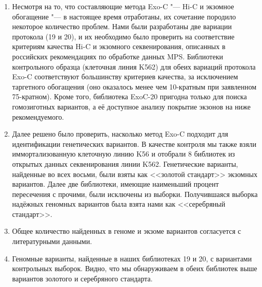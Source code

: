 \documentclass[a4paper,14pt]{extarticle}
\begin{document}
\begin{enumerate}
\item Несмотря на то, что составляющие метода Exo-C "--- Hi-C и экзомное обогащение "--- в настоящее время отработаны, их сочетание породило некоторое количество проблем.
Нами были разработаны две вариации протокола (19 и 20), и их необходимо было проверить на соответствие критериям качества Hi-C и экзомного секвенирования, описанных в российских рекомендациях по обработке данных MPS.
Библиотеки контрольного образца (клеточная линия K562) для обеих вариаций протокола Exo-C соответствуют большинству критериев качества, за исключением таргетного обогащения (оно оказалось менее чем 10-кратным при заявленном 75-кратном). Кроме того, библиотека ExoC-20 пригодна только для поиска гомозиготных вариантов, а её доступное анализу покрытие экзонов на  ниже рекомендуемого.

\item Далее решено было проверить, насколько метод Exo-C подходит для идентификации генетических вариантов.
В качестве контроля мы также взяли иммортализованную клеточную линию K56 и отобрали 8 библиотек из открытых данных секвенирования линии K562.
Генетические варианты, найденные во всех восьми, были взяты как <<золотой стандарт>> экзомных вариантов.
Далее две библиотеки, имеющие наименьший процент пересечения с прочими, были исключены из выборки.
Получившаяся выборка надёжных геномных вариантов была взята нами как <<серебряный стандарт>>.

\item Общее количество найденных в геноме и экзоме вариантов согласуется с литературными данными.

\item Геномные варианты, найденные в наших библиотеках 19 и 20, с вариантами контрольных выборок. Видно, что мы обнаруживаем в обеих библиотек выше  вариантов золотого и серебряного стандарта.



\end{enumerate}
\end{document}
